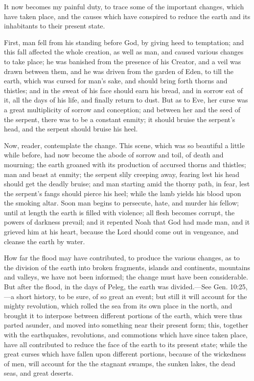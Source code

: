It now becomes my painful duty, to trace some of the important changes, which have taken
place, and the causes which have conspired to reduce the earth and its inhabitants to their
present state.

First, man fell from his standing before God, by giving heed to temptation; and this fall
affected the whole creation, as well as man, and caused various changes to take place; he was
banished from the presence of his Creator, and a veil was drawn between them, and he was
driven from the garden of Eden, to till the earth, which was cursed for man's sake, and should
bring forth thorns and thistles; and in the sweat of his face should earn his bread, and in
sorrow eat of it, all the days of his life, and finally return to dust. But as to Eve, her curse was
a great multiplicity of sorrow and conception; and between her and the seed of the serpent,
there was to be a constant enmity; it should bruise the serpent's head, and the serpent should
bruise his heel.

Now, reader, contemplate the change. This scene, which was so beautiful a little while
before, had now become the abode of sorrow and toil, of death and mourning; the earth
groaned with its production of accursed thorns and thistles; man and beast at enmity; the
serpent slily creeping away, fearing lest his head should get the deadly bruise; and man
starting amid the thorny path, in fear, lest the serpent's fangs should pierce his heel; while the
lamb yields his blood upon the smoking altar. Soon man begins to persecute, hate, and
murder his fellow; until at length the earth is filled with violence; all flesh becomes corrupt,
the powers of darkness prevail; and it repented Noah that God had made man, and it grieved
him at his heart, because the Lord should come out in vengeance, and cleanse the earth by
water.

How far the flood may have contributed, to produce the various changes, as to the division of
the earth into broken fragments, islands and continents, mountains and valleys, we have not
been informed; the change must have been considerable. But after the flood, in the days of
Peleg, the earth was divided.—See Gen. 10:25,—a short history, to be sure, of so great an
event; but still it will account for the mighty revolution, which rolled the sea from its own
place in the north, and brought it to interpose between different portions of the earth, which
were thus parted asunder, and moved into something near their present form; this, together
with the earthquakes, revolutions, and commotions which have since taken place, have all
contributed to reduce the face of the earth to its present state; while the great curses which
have fallen upon different portions, because of the wickedness of men, will account for the
the stagnant swamps, the sunken lakes, the dead seas, and great deserts.

